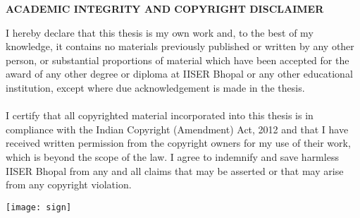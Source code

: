 

\begin{center}
{\textbf{\Large{ACADEMIC INTEGRITY AND COPYRIGHT DISCLAIMER}}}
 \end{center}
I hereby declare that this thesis is my own work and, to the best of my knowledge, it contains no materials previously published or written by any other person, or substantial proportions of material which have been accepted for the award of any other degree or diploma at IISER Bhopal or any other educational institution, except where due acknowledgement is made in the thesis. \\ \\
I certify that all copyrighted material incorporated into this thesis is in compliance with the Indian Copyright (Amendment) Act, 2012 and that I have received written permission from the copyright owners for my use of their work, which is beyond the scope of the law. I agree to indemnify and save harmless IISER Bhopal from any and all claims that may be asserted or that may arise from any copyright violation.

\vspace{2cm}
\parbox{0.7\textwidth}{ 
}
\hfill 
\parbox{0.3\textwidth}{ 
	\texttt{[image: sign]}
\mbox{\studentname}
}